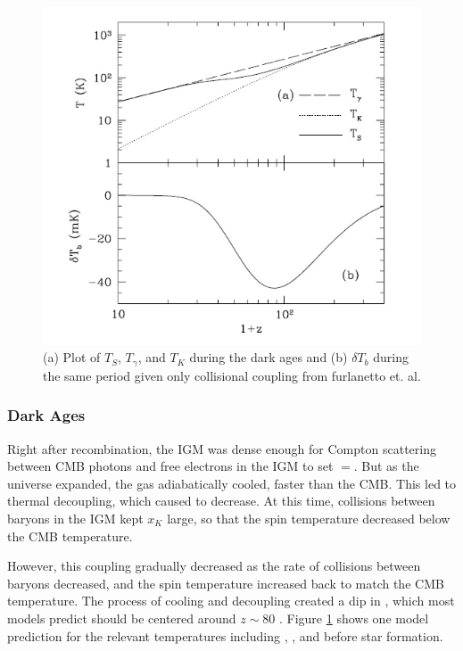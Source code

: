 \begin{figure}[htb]
\begin{center}
\includegraphics[width=0.95\linewidth]{Introduction/figures/dark_ages_global_spectrum.jpg}
\caption{(a) Plot of $T_S$, $T_\gamma$, and $T_K$ during the dark ages and (b) $\delta T_b$ during the same period given only collisional coupling from furlanetto et. al. \cite{furlanetto_2006}}
\label{Fig:da_global}
\end{center}
\end{figure}

\subsubsection{Dark Ages}

Right after recombination, the IGM was dense enough for Compton scattering between CMB photons and free electrons in the IGM to set \tk$=$\tg. But as the universe expanded, the gas adiabatically cooled, faster than the CMB. This led to thermal decoupling, which caused \tk to decrease. At this time, collisions between baryons in the IGM kept $x_K$ large, so that the spin temperature decreased below the CMB temperature. 

However, this coupling gradually decreased as the rate of collisions between baryons decreased, and the spin temperature increased back to match the CMB temperature. The process of cooling and decoupling created a dip in \ts, which most models predict should be centered around $z \sim 80 $ \cite{furlanetto_2006}. Figure \ref{Fig:da_global} shows one model prediction for the relevant temperatures including \tg, \tk, \ts and \dtb before star formation. 

